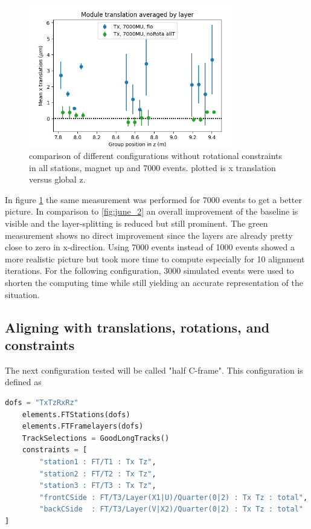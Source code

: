 \begin{figure}
  \centering
  \includegraphics[width=0.8\textwidth]{plots/june_21/Tx_noRota_allT_7000MU.png}
  \caption{comparison of different configurations without rotational constraints in all stations, magnet up and 7000 events. plotted is x translation versus global z.}
  \label{fig:june_2_1}
\end{figure}

In figure \ref{fig:june_2_1} the same measurement was performed for 7000 events to get a better picture. In comparison to \ref{fig:june_2} an overall improvement of the baseline is visible and the layer-splitting is reduced but still prominent. The green measurement shows no direct improvement since the layers are already pretty close to zero in x-direction.
Using 7000 events instead of 1000 events showed a more realistic picture but
took more time to compute especially for 10 alignment iterations.
For the following configuration, 3000 simulated events were used to shorten the computing time while still yielding an accurate representation of the situation.

\subsection{Aligning with translations, rotations, and constraints}
The next configuration tested will be called "half C-frame". This configuration is defined as

\begin{lstlisting}[language=Python]
    dofs = "TxTzRxRz"
    elements.FTStations(dofs)
    elements.FTFramelayers(dofs)
    TrackSelections = GoodLongTracks()
    constraints = [
        "station1 : FT/T1 : Tx Tz",
        "station2 : FT/T2 : Tx Tz",
        "station3 : FT/T3 : Tx Tz",
        "frontCSide : FT/T3/Layer(X1|U)/Quarter(0|2) : Tx Tz : total",
        "backCSide  : FT/T3/Layer(V|X2)/Quarter(0|2) : Tx Tz : total"
]
\end{lstlisting}


